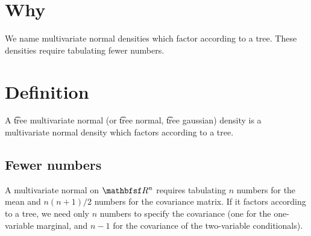 

\section*{Why}

We name multivariate normal densities which factor according to a tree.
These densities require tabulating fewer numbers.

\section*{Definition}

A \t{tree multivariate normal} (or \t{tree normal}, \t{tree gaussian}) density is a multivariate normal density which factors according to a tree.

\subsection*{Fewer numbers}

A multivariate normal on $\R ^n$ requires tabulating $n$ numbers for the mean and $n(n+1)/2$ numbers for the covariance matrix. If it factors according to a tree, we need only $n$ numbers to specify the covariance (one for the one-variable marginal, and $n-1$ for the covariance of the two-variable conditionals).

\blankpage